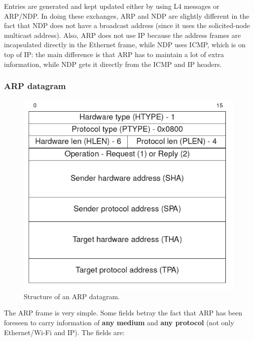 Entries are generated and kept updated either by using L4 messages or ARP/NDP. In doing these exchanges, ARP and NDP are slightly different in the fact that NDP does not have a broadcast address (since it uses the solicited-node multicast address). Also, ARP does not use IP because the address frames are incapsulated directly in the Ethernet frame, while NDP uses ICMP, which is on top of IP: the main difference is that ARP has to maintain a lot of extra information, while NDP gets it directly from the ICMP and IP headers. 


\subsubsection{ARP datagram}
\begin{figure}[h]
    \centering
    \includegraphics[scale=0.5]{img/arp_datagram.png}
    \decoRule
    \caption{Structure of an ARP datagram.}
    \label{fig:arp_datagram}
\end{figure}

The ARP frame is very simple. Some fields betray the fact that ARP has been foreseen to carry information of \textbf{any medium} and \textbf{any protocol} (not only Ethernet/Wi-Fi and IP). The fields are:

